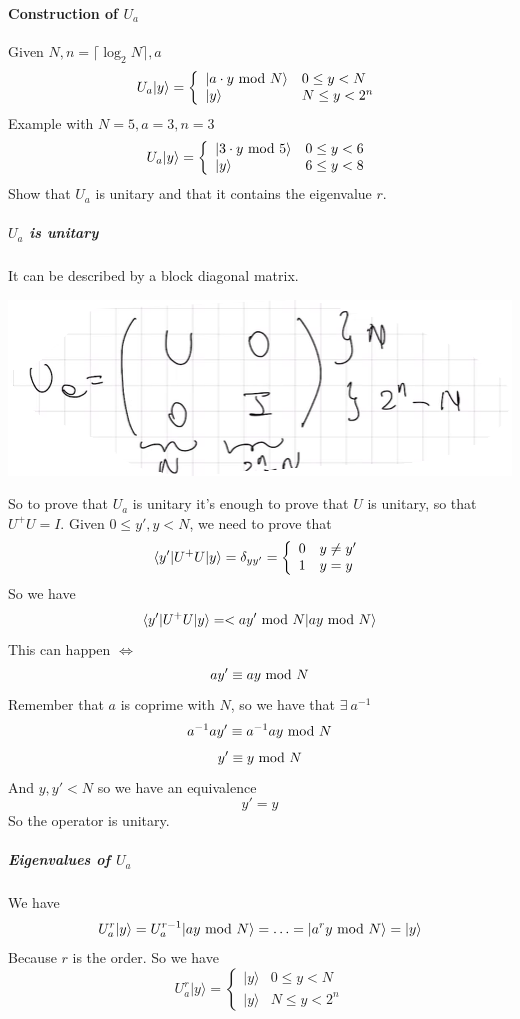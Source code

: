\documentclass[10pt]{report}
\begin{document}
\paragraph{Construction of $U_a$} Given $N, n=\lceil\log_2N\rceil, a$
$$U_a|y\rangle=\left\{\begin{array}{ll}
|a\cdot y\hbox{ mod }N\rangle&0\leq y<N\\
|y\rangle&N\leq y< 2^n
\end{array}\right.$$
Example with $N=5, a=3, n=3$$$U_a|y\rangle=\left\{\begin{array}{ll}
|3\cdot y\hbox{ mod }5\rangle&0\leq y<6\\
|y\rangle&6\leq y< 8
\end{array}\right.$$
Show that $U_a$ is unitary and that it contains the eigenvalue $r$.
\subparagraph{$U_a$ is unitary} It can be described by a block diagonal matrix.\begin{center}
	\includegraphics[scale=0.5]{38.png}
\end{center}
So to prove that $U_a$ is unitary it's enough to prove that $U$ is unitary, so that $U^+U = I$. Given $0\leq y',y<N$, we need to prove that
$$\langle y'|U^+U|y\rangle = \delta_{yy'} = \left\{\begin{array}{l l}
0&y\neq y'\\
1&y=y
\end{array}\right.$$
So we have $$\langle y'|U^+U|y\rangle = <ay'\hbox{ mod }N|ay\hbox{ mod }N\rangle$$
This can happen $\Leftrightarrow$
$$ay'\equiv ay\hbox{ mod }N$$
Remember that $a$ is coprime with $N$, so we have that $\exists\:a^{-1}$
$$a^{-1}ay'\equiv a^{-1}ay\hbox{ mod }N$$
$$y'\equiv y\hbox{ mod }N$$
And $y,y'<N$ so we have an equivalence
$$y' = y$$
So the operator is unitary.
\subparagraph{Eigenvalues of $U_a$} We have $$U_a^r|y\rangle = U_a^{r-1}|ay\hbox{ mod }N\rangle = \ldots = |a^ry\hbox{ mod }N\rangle = |y\rangle$$
Because $r$ is the order. So we have $$U_a^r|y\rangle = \left\{\begin{array}{ll}
|y\rangle&0\leq y<N\\
|y\rangle&N\leq y<2^n
\end{array}\right.$$
\end{document}
